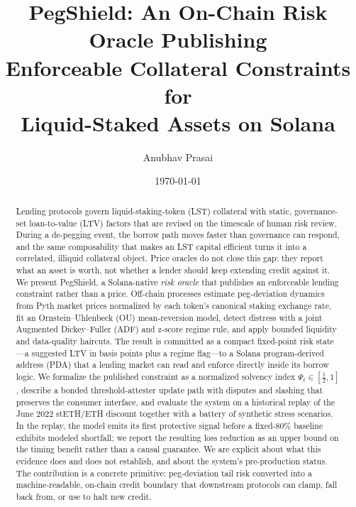 \documentclass[aps,prx,reprint,nofootinbib,longbibliography]{revtex4-2}
\begin{document}
\title{PegShield: An On-Chain Risk Oracle Publishing\\Enforceable Collateral Constraints for\\Liquid-Staked Assets on Solana}

\author{Anubhav Prasai}

\date{\today}

\begin{abstract}
Lending protocols govern liquid-staking-token (LST) collateral with static,
governance-set loan-to-value (LTV) factors that are revised on the timescale of
human risk review. During a de-pegging event, the borrow path moves faster than
governance can respond, and the same composability that makes an LST capital
efficient turns it into a correlated, illiquid collateral object. Price oracles
do not close this gap: they report what an asset is worth, not whether a lender
should keep extending credit against it. We present PegShield, a Solana-native
\emph{risk oracle} that publishes an enforceable lending constraint rather than a
price. Off-chain processes estimate peg-deviation dynamics from Pyth market prices
normalized by each token's canonical staking exchange rate, fit an
Ornstein--Uhlenbeck (OU) mean-reversion model, detect distress with a joint
Augmented Dickey--Fuller (ADF) and z-score regime rule, and apply bounded
liquidity and data-quality haircuts. The result is committed as a compact
fixed-point risk state---a suggested LTV in basis points plus a regime flag---to a
Solana program-derived address (PDA) that a lending market can read and enforce
directly inside its borrow logic. We formalize the published constraint as a
normalized solvency index $\Psi_t\in[\tfrac12,1]$, describe a bonded
threshold-attester update path with disputes and slashing that preserves the
consumer interface, and evaluate the system on a historical replay of the June
2022 stETH/ETH discount together with a battery of synthetic stress scenarios. In
the replay, the model emits its first protective signal before a fixed-80\% baseline
exhibits modeled shortfall; we report the resulting loss reduction as an upper bound
on the timing benefit rather than a causal guarantee. We are explicit about what this
evidence does and does not establish, and about the system's pre-production status. The contribution is a
concrete primitive: peg-deviation tail risk converted into a machine-readable,
on-chain credit boundary that downstream protocols can clamp, fall back from, or
use to halt new credit.
\end{abstract}
\end{document}
